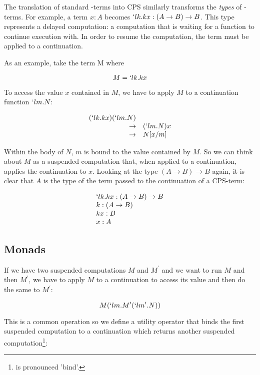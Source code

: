   The translation of standard \lam-terms into CPS similarly transforms the 
  \emph{types} of \lam-terms. For example, a term $x : A$ becomes 
  $`lk.kx : (A \to B) \to B$. This type represents a delayed computation:
  a computation that is waiting for a function to continue execution with. 
  In order to resume the computation, the term must be applied to a 
  continuation.
  
  As an example, take the term M where
  
  \[
    M = `lk.kx
  \]

  To access the value $x$ contained in $M$, we have to apply $M$ to a
  continuation function $`lm.N$:
  
  \[
  \begin{array}{rl}
      (`lk.kx)(`lm.N) \\
      \to & (`lm.N)x \\
      \to & N[x/m]
  \end{array}
  \]
  
  Within the body of $N$, $m$ is bound to the value contained by $M$.
  So we can think about $M$ as a suspended computation that, when applied
  to a continuation, applies the continuation to $x$. Looking at
  the type $(A \to B) \to B$ again, it is clear that $A$ is the type
  of the term passed to the continuation of a CPS-term:
  
  \[
  \begin{array}{l}
    `lk.kx : (A \to B) \to B \\
    k : (A \to B) \\
    kx : B \\
    x : A \\
  \end{array} 
  \]
  
 
  \subsection{Monads}
  
  If we have two suspended computations $M$ and $M^\prime$ and we want to
  run $M$ and then $M^\prime$, we have to apply $M$ to a continuation
  to access its value and then do the same to $M^\prime$:
  
  \[
    M(`lm.M^\prime(`lm^\prime.N))
  \]
  
  This is a common operation so we define a utility operator \mono{>>=}
  that binds the first suspended computation to a continuation which 
  returns another suspended computation\footnote{ \mono{(>>=)} is pronounced 'bind'.}:
 
